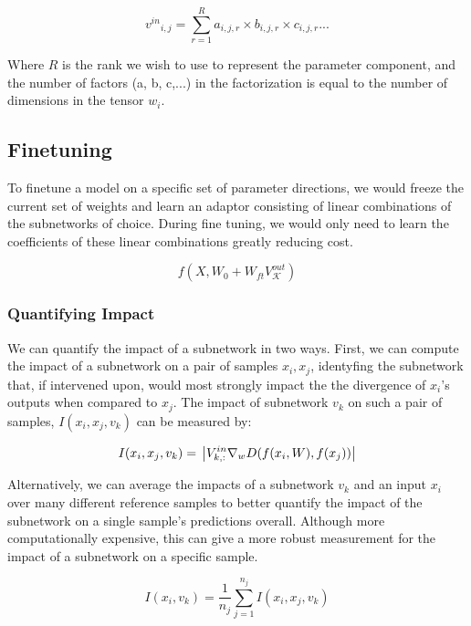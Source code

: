 \documentclass{article}
\theoremstyle{plain}
\theoremstyle{definition}
\theoremstyle{remark}
\begin{document}
\begin{equation}
{v^{in}}_{i,j} = \sum_{r=1}^{R} a_{i,j,r} \times b_{i,j,r} \times c_{i,j,r} ...
\end{equation}

Where $R$ is the rank we wish to use to represent the parameter component, and the number of factors (a, b, c,...) in the factorization is equal to the number of dimensions in the tensor $w_i$.

\subsection{Finetuning}\label{sec:finetuning}

To finetune a model on a specific set of parameter directions, we would freeze the current set of weights and learn an adaptor consisting of linear combinations of the subnetworks of choice. During fine tuning, we would only need to learn the coefficients of these linear combinations greatly reducing cost.

\begin{equation}
    f(X, W_0 + W_{ft} V^{out}_\mathcal{K})
\end{equation}

\subsubsection{Quantifying Impact}\label{sec:impact}

We can quantify the impact of a subnetwork in two ways. First, we can compute the impact of a subnetwork on a pair of samples $x_i, x_j$, identyfing the subnetwork that, if intervened upon, would most strongly impact the the divergence of $x_i$'s outputs when compared to $x_j$. The impact of subnetwork $v_k$ on such a pair of samples, $I(x_i, x_j, v_k)$ can be measured by:

\begin{equation}
    I(x_i, x_j, v_k) = \\
    \left| V^{in}_{k,:} \nabla_w D(f(x_i, W), f(x_j)) \right|
\end{equation}

Alternatively, we can average the impacts of a subnetwork $v_k$ and an input $x_i$ over many different reference samples to better quantify the impact of the subnetwork on a single sample's predictions overall. Although more computationally expensive, this can give a more robust measurement for the impact of a subnetwork on a specific sample. 

\begin{equation}
    I(x_i, v_k) = \frac{1}{n_j} \sum_{j=1}^{n_j} I(x_i, x_j, v_k)
\end{equation}
\end{document}
